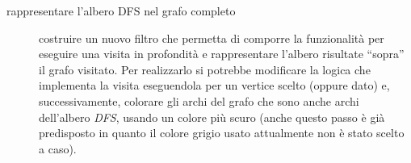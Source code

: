 \begin{description}
\item[rappresentare l'albero DFS nel grafo completo] costruire un
  nuovo filtro che permetta di comporre la funzionalit\`a per eseguire
  una visita in profondit\`a e rappresentare l'albero risultate
  ``sopra'' il grafo visitato. Per realizzarlo si potrebbe modificare
  la logica che implementa la visita eseguendola per un vertice scelto
  (oppure dato) e, successivamente, colorare gli archi del grafo che
  sono anche archi dell'albero \emph{DFS}, usando un colore pi\`u
  scuro (anche questo passo \`e gi\`a predisposto in quanto il colore
  grigio usato attualmente non \`e stato scelto a caso).


\end{description}

